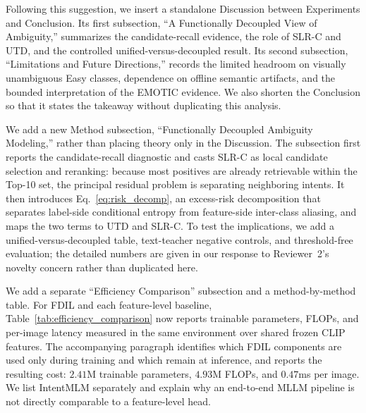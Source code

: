 {Following this suggestion, we insert a standalone Discussion between Experiments and Conclusion. Its first subsection, ``A Functionally Decoupled View of Ambiguity,'' summarizes the candidate-recall evidence, the role of SLR-C and UTD, and the controlled unified-versus-decoupled result. Its second subsection, ``Limitations and Future Directions,'' records the limited headroom on visually unambiguous Easy classes, dependence on offline semantic artifacts, and the bounded interpretation of the EMOTIC evidence. We also shorten the Conclusion so that it states the takeaway without duplicating this analysis.
}

{We add a new Method subsection, ``Functionally Decoupled Ambiguity Modeling,'' rather than placing theory only in the Discussion. The subsection first reports the candidate-recall diagnostic and casts SLR-C as local candidate selection and reranking: because most positives are already retrievable within the Top-10 set, the principal residual problem is separating neighboring intents. It then introduces Eq.~\eqref{eq:risk_decomp}, an excess-risk decomposition that separates label-side conditional entropy from feature-side inter-class aliasing, and maps the two terms to UTD and SLR-C. To test the implications, we add a unified-versus-decoupled table, text-teacher negative controls, and threshold-free evaluation; the detailed numbers are given in our response to Reviewer~2's novelty concern rather than duplicated here.
}
\showUnifiedDecoupled
\showNegativeControls
\showThresholdFree

{We add a separate ``Efficiency Comparison'' subsection and a method-by-method table. For FDIL and each feature-level baseline, Table~\ref{tab:efficiency_comparison} now reports trainable parameters, FLOPs, and per-image latency measured in the same environment over shared frozen CLIP features. The accompanying paragraph identifies which FDIL components are used only during training and which remain at inference, and reports the resulting cost: $2.41$M trainable parameters, $4.93$M FLOPs, and $0.47$ms per image. We list IntentMLM separately and explain why an end-to-end MLLM pipeline is not directly comparable to a feature-level head.
}
\showEfficiencyComparison
